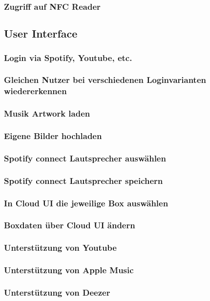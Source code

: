 \documentclass[10pt, a4paper, draft]{article}
\begin{document}
\subsubsection{Zugriff auf NFC Reader}

\subsection{User Interface}
\subsubsection{Login via Spotify, Youtube, etc.}
\subsubsection{Gleichen Nutzer bei verschiedenen Loginvarianten wiedererkennen}
\subsubsection{Musik Artwork laden}
\subsubsection{Eigene Bilder hochladen}
\subsubsection{Spotify connect Lautsprecher auswählen}
\subsubsection{Spotify connect Lautsprecher speichern}
\subsubsection{In Cloud UI die jeweilige Box auswählen}
\subsubsection{Boxdaten über Cloud UI ändern}
\subsubsection{Unterstützung von Youtube}
\subsubsection{Unterstützung von Apple Music}
\subsubsection{Unterstützung von Deezer}
\end{document}
